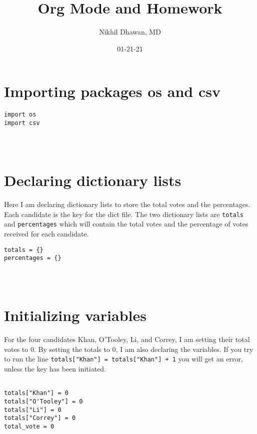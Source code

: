 \documentclass[11pt]{article}
\author{Nikhil Dhawan, MD}
\date{01-21-21}
\title{Org Mode and Homework}
\begin{document}
\maketitle
\tableofcontents



\section{Importing packages os and csv}
\label{sec:org45fe6c1}
\begin{verbatim}
import os
import csv
\end{verbatim}

\begin{verbatim}



\end{verbatim}

\section{Declaring dictionary lists}
\label{sec:org5a2fec5}

Here I am declaring dictionary lists to store the total votes and the percentages. Each candidate is the key for the dict file. The two dictionary lists are \texttt{totals} and \texttt{percentages} which will contain the total votes and the percentage of votes received for each candidate. 

\begin{verbatim}
totals = {}
percentages = {}
\end{verbatim}

\begin{verbatim}



\end{verbatim}

\section{Initializing variables}
\label{sec:orgfb0a185}
For the four candidates Khan, O'Tooley, Li, and Correy, I am setting their total votes to 0. By setting the totals to 0, I am also declaring the variables. If you try to run the line \texttt{\texttt{totals["Khan"] = totals["Khan"] + 1}} you will get an error, unless the key has been initiated. 

\begin{verbatim}

totals["Khan"] = 0
totals["O'Tooley"] = 0
totals["Li"] = 0
totals["Correy"] = 0
total_vote = 0

\end{verbatim}
\end{document}

